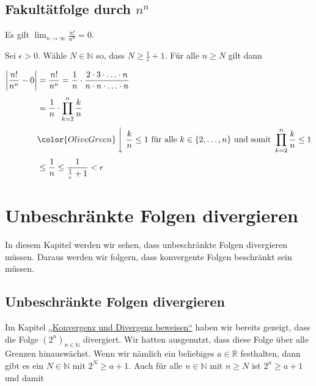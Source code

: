 \documentclass[fontsize=9pt,
               parskip=half-,
               DIV=14,
               listof=chapterentry,
               tocflat]{scrbook}
\begin{document}
\section{Fakultätfolge durch $n^{n}$}

\begin{theorem*}
Es gilt $\lim _{n\rightarrow \infty }{\tfrac {n!}{n^{n}}}=0$.

\end{theorem*}

\begin{proof*}
Sei $\epsilon >0$. Wähle $N\in \mathbb {N} $ so, dass $N\geq {\tfrac {1}{\epsilon }}+1$. Für alle $n\geq N$ gilt dann

\begin{align*}
\left|{\frac {n!}{n^{n}}}-0\right|&={\frac {n!}{n^{n}}}={\frac {1}{n}}\cdot {\frac {2\cdot 3\cdot \ldots \cdot n}{n\cdot n\cdot \ldots \cdot n}}\\[0.3em]&={\frac {1}{n}}\cdot \prod _{k=2}^{n}{\frac {k}{n}}\\[0.3em]&{\color {OliveGreen}\left\downarrow \ {\frac {k}{n}}\leq 1{\text{ für alle }}k\in \{2,\ldots ,n\}{\text{ und somit }}\prod _{k=2}^{n}{\frac {k}{n}}\leq 1\right.}\\[0.3em]&\leq {\frac {1}{n}}\leq {\frac {1}{{\tfrac {1}{\epsilon }}+1}}<\epsilon 
\end{align*}

\end{proof*}

\chapter{Unbeschränkte Folgen divergieren}

In diesem Kapitel werden wir sehen, dass unbeschränkte Folgen divergieren müssen. Daraus werden wir folgern, dass konvergente Folgen beschränkt sein müssen.

\section{Unbeschränkte Folgen divergieren}

Im Kapitel \href{https://de.wikibooks.org/wiki/Mathe\_für\_Nicht-Freaks:\_Konvergenz\_und\_Divergenz\_beweisen\#Anker:Divergenz}
{„Konvergenz und Divergenz beweisen“} haben wir bereits gezeigt, dass die Folge $\left(2^{n}\right)_{n\in \mathbb {N} }$ divergiert. Wir hatten ausgenutzt, dass diese Folge über alle Grenzen hinauswächst. Wenn wir nämlich ein beliebiges $a\in \mathbb {R} $ festhalten, dann gibt es ein $N\in \mathbb {N} $ mit $2^{N}\geq a+1$. Auch für alle $n\in \mathbb {N} $ mit $n\geq N$ ist $2^{n}\geq a+1$ und damit
\end{document}
